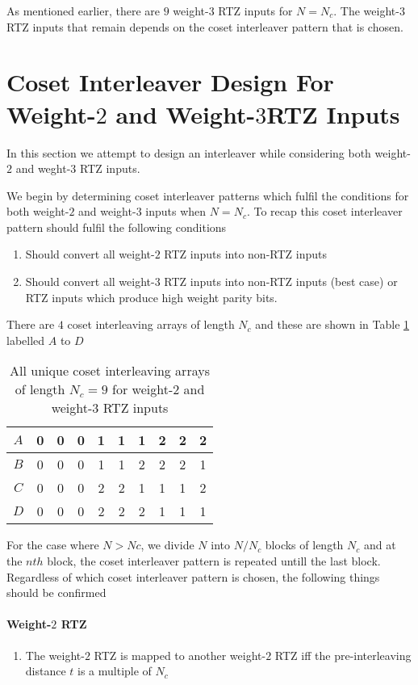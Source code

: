 \documentclass[11pt, oneside, dvipdfmx]{book}
\begin{document}
As mentioned earlier, there are $9$ weight-$3$ RTZ inputs for $N=N_c$. The weight-$3$ RTZ inputs that remain depends on the coset interleaver pattern that is chosen.

\section{Coset Interleaver Design For Weight-$2$ and Weight-$3$RTZ Inputs}
In this section we attempt to design an interleaver while considering both weight-$2$ and weght-$3$ RTZ inputs.

We begin by determining coset interleaver patterns which fulfil the conditions for both weight-$2$ and weight-$3$ inputs when $N=N_c$. To recap this coset interleaver pattern should fulfil the following conditions

\begin{enumerate}
\item Should convert all weight-$2$ RTZ inputs into non-RTZ inputs

\item Should convert all weight-$3$ RTZ inputs into non-RTZ inputs (best case) or RTZ inputs which produce high weight parity bits.
\end{enumerate}

There are $4$ coset interleaving arrays of length $N_c$ and these are shown in Table \ref{tb3} labelled $A$ to $D$
\begin{table}[h!]
\centering
\begin{tabular}{|c || c  c  c  c  c  c  c  c  c |} 
 \hline
 $A$ & 0 & 0 & 0 & 1 & 1 & 1 & 2 & 2 & 2\\ 
  \hline
 $B$ & 0 & 0 & 0 & 1 & 1 & 2 & 2 & 2 & 1\\ 
 \hline
$C$ & 0 & 0 & 0 & 2 & 2 & 1 & 1 & 1 & 2\\ 
 \hline
$D$ & 0 & 0 & 0 & 2 & 2 & 2 & 1 & 1 & 1\\ 
 \hline

\end{tabular}
\caption{All unique coset interleaving arrays of length $N_c =9$ for weight-$2$ and weight-$3$ RTZ inputs}
\label{tb3}
\end{table}

For the case where $N>Nc$, we divide $N$ into $N/N_c$ blocks of length $N_c$ and at the $nth$ block, the coset interleaver pattern is repeated untill the last block. Regardless of which coset interleaver pattern is chosen, the following things should be confirmed

\paragraph{Weight-$2$ RTZ}
\begin{enumerate}
\item The weight-$2$ RTZ is mapped to another weight-$2$ RTZ iff the pre-interleaving distance $t$ is a multiple of $N_c$
\end{enumerate}
\end{document}
